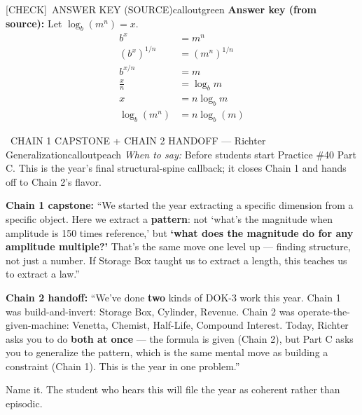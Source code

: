 \documentclass[11pt]{article}
\newcommand{\IconCheck}{[CHECK]}
\newcommand{\teacheranswerbox}[2]{%
  \begin{callout}{#1}{calloutgreen}
  #2
  \end{callout}
}
\begin{document}
\teacheranswerbox{\IconCheck\ ANSWER KEY (SOURCE)}{%
\textbf{Answer key (from source):} Let \(\log_b(m^n)=x\).
\[
\begin{aligned}
b^x&=m^n \\
\left(b^x\right)^{1/n}&=\left(m^n\right)^{1/n} \\
b^{x/n}&=m \\
\frac{x}{n}&=\log_b m \\
x&=n\log_b m \\
\log_b(m^n)&=n\log_b(m)
\end{aligned}
\]
}

\begin{callout}{\IconSpeak\ CHAIN 1 CAPSTONE + CHAIN 2 HANDOFF --- Richter Generalization}{calloutpeach}
\textit{When to say:} Before students start Practice \#40 Part C. This is the year's final structural-spine callback; it closes Chain 1 and hands off to Chain 2's flavor.

\smallskip
\textbf{Chain 1 capstone:} ``We started the year extracting a specific dimension from a specific object. Here we extract a \textbf{pattern}: not `what's the magnitude when amplitude is 150 times reference,' but \textbf{`what does the magnitude do for any amplitude multiple?'} That's the same move one level up --- finding structure, not just a number. If Storage Box taught us to extract a length, this teaches us to extract a law.''

\smallskip
\textbf{Chain 2 handoff:} ``We've done \textbf{two} kinds of DOK-3 work this year. Chain 1 was build-and-invert: Storage Box, Cylinder, Revenue. Chain 2 was operate-the-given-machine: Venetta, Chemist, Half-Life, Compound Interest. Today, Richter asks you to do \textbf{both at once} --- the formula is given (Chain 2), but Part C asks you to generalize the pattern, which is the same mental move as building a constraint (Chain 1). This is the year in one problem.''

\smallskip
Name it. The student who hears this will file the year as coherent rather than episodic.
\end{callout}
\end{document}
